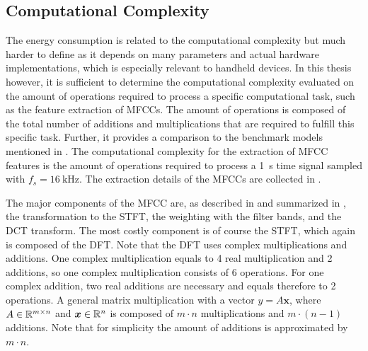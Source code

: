 
\subsection{Computational Complexity}\label{sec:signal_mfcc_complexity}
The energy consumption is related to the computational complexity but much harder to define as it depends on many parameters and actual hardware implementations, which is especially relevant to handheld devices.
In this thesis however, it is sufficient to determine the computational complexity evaluated on the amount of operations required to process a specific computational task, such as the feature extraction of MFCCs.
The amount of operations is composed of the total number of additions and multiplications that are required to fulfill this specific task.
Further, it provides a comparison to the benchmark models mentioned in .
The computational complexity for the extraction of MFCC features is the amount of operations required to process a \SI{1}{\second} time signal sampled with $f_s = \SI{16}{\kilo\hertz}$.
The extraction details of the MFCCs are collected in .

The major components of the MFCC are, as described in  and summarized in , the transformation to the STFT, the weighting with the filter bands, and the DCT transform.
The most costly component is of course the STFT, which again is composed of the DFT.
Note that the DFT uses complex multiplications and additions.
One complex multiplication equals to 4 real multiplication and 2 additions, so one complex multiplication consists of 6 operations.
For one complex addition, two real additions are necessary and equals therefore to 2 operations.
A general matrix multiplication with a vector $y = A \bm{x}$, where $A \in \mathbb{R}^{m \times n}$ and $\bm{x} \in \mathbb{R}^n$ is composed of $m \cdot n$ multiplications and $m \cdot (n - 1)$ additions.
Note that for simplicity the amount of additions is approximated by $m \cdot n$.

